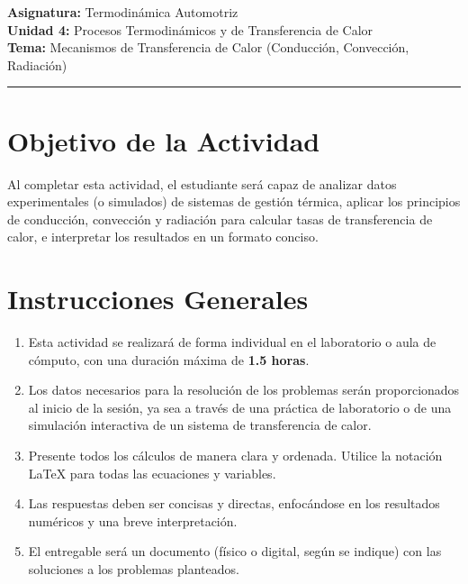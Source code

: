 \documentclass{article}
\begin{document}

\textbf{Asignatura:} Termodinámica Automotriz \\
\textbf{Unidad 4:} Procesos Termodinámicos y de Transferencia de Calor \\
\textbf{Tema:} Mecanismos de Transferencia de Calor (Conducción, Convección, Radiación)

\vspace{5mm}
\hrule
\vspace{5mm}

\section*{Objetivo de la Actividad}

Al completar esta actividad, el estudiante será capaz de analizar datos experimentales (o simulados) de sistemas de gestión térmica, aplicar los principios de conducción, convección y radiación para calcular tasas de transferencia de calor, e interpretar los resultados en un formato conciso.

\section*{Instrucciones Generales}

\begin{enumerate}
    \item Esta actividad se realizará de forma individual en el laboratorio o aula de cómputo, con una duración máxima de \textbf{1.5 horas}.
    \item Los datos necesarios para la resolución de los problemas serán proporcionados al inicio de la sesión, ya sea a través de una práctica de laboratorio o de una simulación interactiva de un sistema de transferencia de calor.
    \item Presente todos los cálculos de manera clara y ordenada. Utilice la notación LaTeX para todas las ecuaciones y variables.
    \item Las respuestas deben ser concisas y directas, enfocándose en los resultados numéricos y una breve interpretación.
    \item El entregable será un documento (físico o digital, según se indique) con las soluciones a los problemas planteados.
\end{enumerate}
\end{document}
